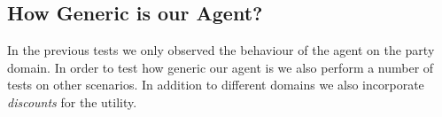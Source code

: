 \subsection{How Generic is our Agent?}

In the previous tests we only observed the behaviour of the agent on the party domain. In order to test how generic our agent is we also perform a number of tests on other scenarios. In addition to different domains we also incorporate \emph{discounts} for the utility. \\


